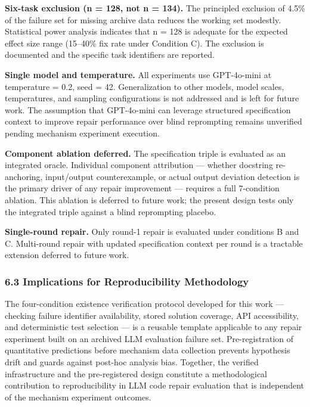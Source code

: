\textbf{Six-task exclusion (n = 128, not n = 134).} The principled exclusion of 4.5\% of the failure set for missing archive data reduces the working set modestly. Statistical power analysis indicates that n = 128 is adequate for the expected effect size range (15--40\% fix rate under Condition C). The exclusion is documented and the specific task identifiers are reported.

\textbf{Single model and temperature.} All experiments use GPT-4o-mini at temperature = 0.2, seed = 42. Generalization to other models, model scales, temperatures, and sampling configurations is not addressed and is left for future work. The assumption that GPT-4o-mini can leverage structured specification context to improve repair performance over blind reprompting remains unverified pending mechanism experiment execution.

\textbf{Component ablation deferred.} The specification triple is evaluated as an integrated oracle. Individual component attribution --- whether docstring re-anchoring, input/output counterexample, or actual output deviation detection is the primary driver of any repair improvement --- requires a full 7-condition ablation. This ablation is deferred to future work; the present design tests only the integrated triple against a blind reprompting placebo.

\textbf{Single-round repair.} Only round-1 repair is evaluated under conditions B and C. Multi-round repair with updated specification context per round is a tractable extension deferred to future work.

\subsubsection{6.3 Implications for Reproducibility Methodology}

The four-condition existence verification protocol developed for this work --- checking failure identifier availability, stored solution coverage, API accessibility, and deterministic test selection --- is a reusable template applicable to any repair experiment built on an archived LLM evaluation failure set. Pre-registration of quantitative predictions before mechanism data collection prevents hypothesis drift and guards against post-hoc analysis bias. Together, the verified infrastructure and the pre-registered design constitute a methodological contribution to reproducibility in LLM code repair evaluation that is independent of the mechanism experiment outcomes.


